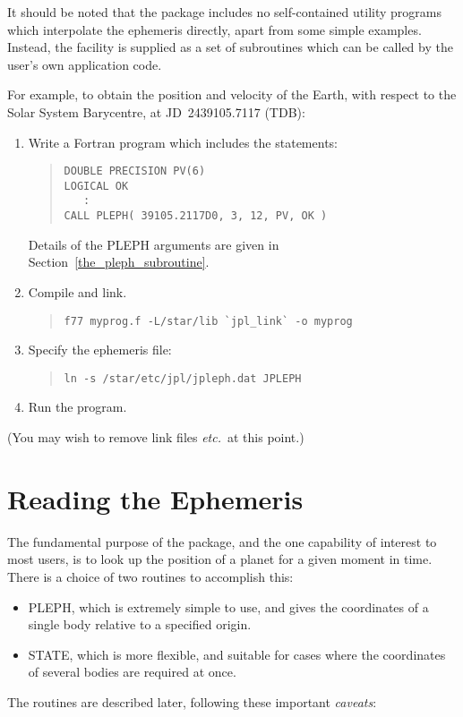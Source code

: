 \documentclass[twoside,11pt]{article}
\newcommand{\htmlref}[2]{#1}
\newcommand{\latexhtml}[2]{#1}
\newcommand{\xlabel}[1]{}
\renewcommand{\_}{\texttt{\symbol{95}}}
\begin{document}
It should be noted that the package includes
no self-contained utility programs which interpolate the ephemeris
directly, apart from some simple examples.  Instead, the facility is
supplied as a set of subroutines which can be called by the user's own
application code.

For example, to obtain the position and velocity of the Earth, with
respect to the Solar System Barycentre, at JD~2439105.7117 (TDB):

\begin{enumerate}
\item Write a Fortran program which includes the statements:
\begin{quote}
\begin{verbatim}
DOUBLE PRECISION PV(6)
LOGICAL OK
   :
CALL PLEPH( 39105.2117D0, 3, 12, PV, OK )
\end{verbatim}
\end{quote}

Details of the PLEPH arguments are given
\latexhtml{in Section~\ref{the_pleph_subroutine}.}%
{in the section \htmlref{`The PLEPH Subroutine}{the_pleph_subroutine}.}

\item Compile and link.
\begin{quote}
\begin{verbatim}
f77 myprog.f -L/star/lib `jpl_link` -o myprog
\end{verbatim}
\end{quote}
\item Specify the ephemeris file:
\begin{quote}
\begin{verbatim}
ln -s /star/etc/jpl/jpleph.dat JPLEPH
\end{verbatim}
\end{quote}
\item Run the program.

\end{enumerate}
(You may wish to remove link files \emph{etc.}\ at this point.)

\section{\xlabel{reading_the_ephemeris}Reading the Ephemeris}
\label{reading_the_ephemeris}

The fundamental purpose of the package, and the one capability
of interest to most users, is to look up the position of
a planet for a given moment in time.
There is a choice of two routines to accomplish this:
\begin{itemize}
\item PLEPH, which is extremely simple to use, and gives
the coordinates of a single body relative to a specified
origin.
\item STATE, which is more flexible, and suitable for
cases where the coordinates
of several bodies are required at once.
\end{itemize}
The routines are described later, following these
important \textit{caveats}\/:
\end{document}
